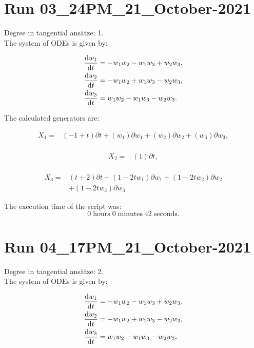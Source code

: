 \section*{Run 03\_24PM\_21\_October-2021}
Degree in tangential ansätze:	1.\\
The system of ODEs is given by:

\begin{align*}
\dv{w_{1}}{t}&=- w_{1} w_{2} - w_{1} w_{3} + w_{2} w_{3},\\
\dv{w_{2}}{t}&=- w_{1} w_{2} + w_{1} w_{3} - w_{2} w_{3},\\
\dv{w_{3}}{t}&=w_{1} w_{2} - w_{1} w_{3} - w_{2} w_{3}.\\
\end{align*}

\noindent The calculated generators are:

\begin{align*}
X_{1}=&\left(-1+t \right)\partial t+\left(w_{1} \right)\partial w_{1}+\left(w_{2} \right)\partial w_{2}+\left(w_{3} \right)\partial w_{3},\\
\end{align*}

\begin{align*}
X_{2}=&\left(1 \right)\partial t,\\
\end{align*}

\begin{align*}
X_{3}=&\left(t+2 \right)\partial t+\left(1- 2 t w_{1} \right)\partial w_{1}+\left(1- 2 t w_{2} \right)\partial w_{2}\\
&+\left(1- 2 t w_{3} \right)\partial w_{3}
\end{align*}

The execution time of the script was:
$$0\;\mathrm{hours}\;0\;\mathrm{minutes}\;42 \;\mathrm{seconds}.$$
\section*{Run 04\_17PM\_21\_October-2021}
Degree in tangential ansätze:	2.\\
The system of ODEs is given by:

\begin{align*}
\dv{w_{1}}{t}&=- w_{1} w_{2} - w_{1} w_{3} + w_{2} w_{3},\\
\dv{w_{2}}{t}&=- w_{1} w_{2} + w_{1} w_{3} - w_{2} w_{3},\\
\dv{w_{3}}{t}&=w_{1} w_{2} - w_{1} w_{3} - w_{2} w_{3}.\\
\end{align*}

